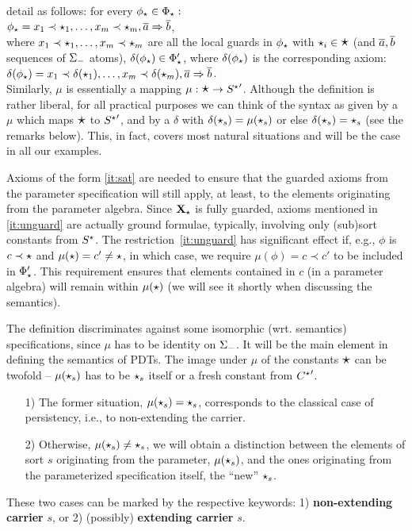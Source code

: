 detail as follows: for every $\phi_\star\in\Phi_\star:$ \\
\hspace*{2em} $\phi_\star =x_1\prec\star_1, \ldots ,x_m\prec\star_m, \overline{a}
 \Rightarrow \overline{b}$, \\ where
$x_1\prec\star_1,\ldots,x_m\prec\star_m$ are all the local guards in
$\phi_\star$ with $\star_i\in\mbox{\Large{$\star$}}$ (and $\overline{a}, \overline{b}$ sequences of $\Sigma_-$
atoms), 
$\delta(\phi_\star)\in\Phi'_\star$,
where $\delta(\phi_\star)$ is the corresponding axiom:\\
\hspace*{1.5em}$\delta(\phi_\star)=x_1\prec\delta(\star_1),
\ldots ,x_m\prec\delta(\star_m),\overline{a} \Rightarrow \overline{b}$.
\\
Similarly, $\mu$ is essentially a mapping $\mu:\mbox{\Large{$\star$}}\to{S^\star}'$. 
Although the definition is rather liberal, for all practical purposes we can
think of the syntax as given by a $\mu$ which maps $\mbox{\Large{$\star$}}$ to ${S^\star}'$,
and by a $\delta$ with
$\delta(\star_s)=\mu(\star_s)$ or else
$\delta(\star_s)=\star_s$ (see the remarks below). This, in fact, covers most natural situations and
will be the case in all our examples.

Axioms of the form \ref{it:sat} are needed to ensure that the guarded axioms
from the parameter specification will still apply, at least, to the elements originating
from the parameter algebra. Since ${\bf X_\star}$ is fully guarded, axioms
mentioned in \ref{it:unguard} are actually ground formulae, typically,
involving only (sub)sort constants from $S^\star$. The
restriction~\ref{it:unguard} has significant effect if, e.g., $\phi$ is
$c\prec\star$ and $\mu(\star)=c'\not=\star$, in which case, we require
$\mu(\phi)=c\prec c'$ to be included in $\Phi'_\star$.
This requirement ensures that elements contained in
$c$ (in a parameter algebra) will remain within $\mu(\star)$ (we will see it
shortly when discussing the semantics).

The definition discriminates against some
isomorphic (wrt. semantics) specifications, since $\mu$ has to be identity on
$\Sigma_-$. 
It will be the main element in defining the
semantics of PDTs.
The image
under $\mu$ of the constants $\mbox{\Large{$\star$}}$ can be twofold -- 
$\mu(\star_s)$ has to be $\star_s$ itself or a
fresh constant from ${C^\star}'$.  
\begin{itemize}\MyLPar
\item[1)] The former situation, $\mu(\star_s)=\star_s$, corresponds to the
classical case of persistency, i.e., to  non-extending the carrier.
\item[2)] Otherwise, $\mu(\star_s)\not=\star_s$, we
will obtain a distinction between the elements of sort $s$ originating from
the parameter, $\mu(\star_s)$, and the ones originating from the parameterized specification
itself, the ``new'' $\star_s$. 
\end{itemize}
These two cases can be marked by the respective keywords: 1) {\bf
non-extending carrier} $s$, or 2) (possibly) {\bf extending carrier} $s$.


